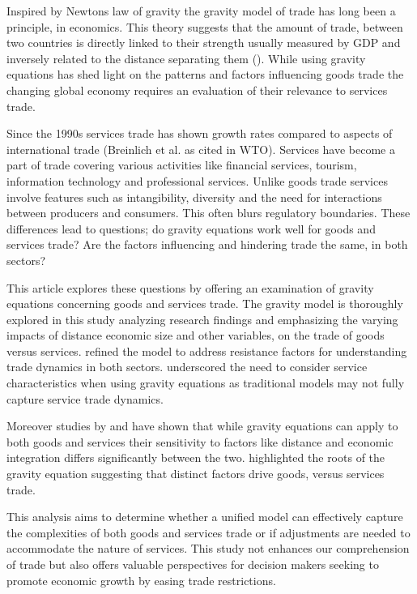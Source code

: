 Inspired by Newtons law of gravity the gravity model of trade has long been a principle, in economics.
This theory suggests that the amount of trade, between two countries is directly linked to their strength usually measured by GDP and inversely related to the distance separating them (\cite{tinbergen1962shaping}). While using gravity equations has shed light on the patterns and factors influencing goods trade the changing global economy requires an evaluation of their relevance to services trade.

Since the 1990s services trade has shown growth rates compared to aspects of international trade (Breinlich et al. as cited in WTO). Services have become a part of trade covering various activities like financial services, tourism, information technology and professional services. Unlike goods trade services involve features such as intangibility, diversity and the need for interactions between producers and consumers. This often blurs regulatory boundaries. These differences lead to questions; do gravity equations work well for goods and services trade? Are the factors influencing and hindering trade the same, in both sectors?

This article explores these questions by offering an examination of gravity equations concerning goods and services trade.
The gravity model is thoroughly explored in this study analyzing research findings and emphasizing the varying impacts of distance economic size and other variables, on the trade of goods versus services. \textcite{Anderson2003} refined the model to address resistance factors for understanding trade dynamics in both sectors. \textcite{Kimura2006} underscored the need to consider service characteristics when using gravity equations as traditional models may not fully capture service trade dynamics.

Moreover studies by \textcite{NBERw12516} and \textcite{EGGER2011263} have shown that while gravity equations can apply to both goods and services their sensitivity to factors like distance and economic integration differs significantly between the two. \textcite{Bergstrand_1985} highlighted the roots of the gravity equation suggesting that distinct factors drive goods, versus services trade.

This analysis aims to determine whether a unified model can effectively capture the complexities of both goods and services trade or if adjustments are needed to accommodate the nature of services.
This study not enhances our comprehension of trade but also offers valuable perspectives for decision makers seeking to promote economic growth by easing trade restrictions.



